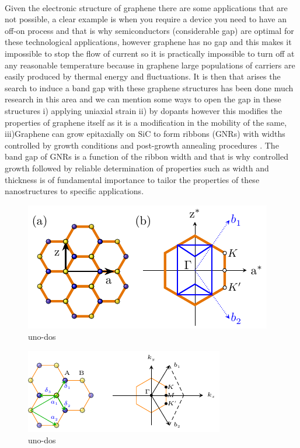 \\
Given the electronic structure of graphene there are some applications that are not possible, a clear example is when you require a device you need to have an off-on process and that is why semiconductors (considerable gap) are optimal for these technological applications, however graphene has no gap and this makes it impossible to stop the flow of current so it is practically impossible to turn off at any reasonable temperature because in graphene large populations of carriers are easily produced by thermal energy and fluctuations. It is then that arises the search to induce a band gap with these graphene structures has been done much research in this area and we can mention some ways to open the gap in these structures i) applying uniaxial strain \cite{ni2008uniaxial}  ii) by dopants however this modifies the properties of graphene itself as it is a modification in the mobility of the same, iii)Graphene can grow epitaxially on SiC to form ribbons (GNRs) with widths controlled by growth conditions and post-growth annealing procedures \cite{celis2016graphene,baringhaus2014exceptional,sprinkle2010scalable}. The band gap of GNRs is a function of the ribbon width and that is why controlled growth followed by reliable determination of properties such as width and thickness is of fundamental importance to tailor the properties of these nanostructures to specific applications\cite{flores2021optical}.





\begin{figure}[H]
	\centering
	\includegraphics[width=0.82\linewidth]{FIGURES/Physical_Background/Teoria_Fig5.pdf}
	\caption{uno-dos}
	\label{fig:sq-how to reflex}
\end{figure}





\begin{figure}[H]
	\centering
	\includegraphics[width=0.85\linewidth]{FIGURES/Physical_Background/Teo_fig1.pdf}
	\caption{uno-dos}
	\label{fig:sq-how to reflex}
\end{figure}

